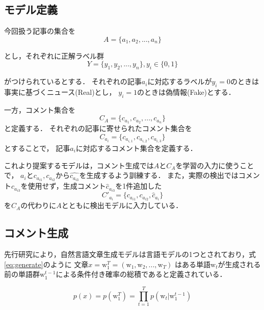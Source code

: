 \subsection{モデル定義}
今回扱う記事の集合を 
\begin{equation}
    A = \{a_1, a_2, ..., a_n\}
\end{equation}

とし，それぞれに正解ラベル群 
\begin{equation}
    Y=\{y_1, y_2, ..., y_n\}, y_i \in \{0, 1\}
\end{equation}

がつけられているとする．
それぞれの記事$a_i$に対応するラベルが$y_i=0$のときは事実に基づくニュース(Real)とし，
$y_i=1$のときは偽情報(Fake)とする．

一方，コメント集合を
\begin{equation}
    C_A = \{c_{a_1}, c_{a_2}, ..., c_{a_n}\}
\end{equation}
と定義する．
それぞれの記事に寄せられたコメント集合を
\begin{equation}
    C_{a_i} = \{c_{a_{i,1}}, c_{a_{i,2}}, c_{a_{i,3}}\}
\end{equation}
とすることで，
記事$a_i$に対応するコメント集合を定義する．

これより提案するモデルは，コメント生成では$A$と$C_A$を学習の入力に使うことで，
$a_i$と$c_{a_{i1}}, c_{a_{i2}}$から$\hat{c_{a_{i3}}}$を生成するよう訓練する．
また，実際の検出ではコメント$c_{a_{i3}}$を使用せず，生成コメント$\hat{c}_{a_{i3}}$を1件追加した
\begin{equation}
    C'_{a_i} = \{ c_{a_{i1}}, c_{a_{i2}}, \hat{c}_{a_{i}}\}
\end{equation}
を$C_A$の代わりに$A$とともに検出モデルに入力している．


\subsection{コメント生成}
\label{sec:method_generate}
先行研究により，自然言語文章生成モデルは言語モデルの1つとされており，式\ref{eq:generate}のように
文章$x = \mathrm{w}_1^T = (\mathrm{w}_1, \mathrm{w}_2, ..., \mathrm{w}_T)$
はある単語$\mathrm{w}_t$が生成される前の単語群$ \mathrm{w}_1^{t-1}$による条件付き確率の総積であると定義されている．

\begin{equation}
    \label{eq:generate}
    p(x) = p(\mathrm{w}_1^T) = \prod_{t=1}^{T} p(\mathrm{w}_t|\mathrm{w}_1^{t-1})
\end{equation}

